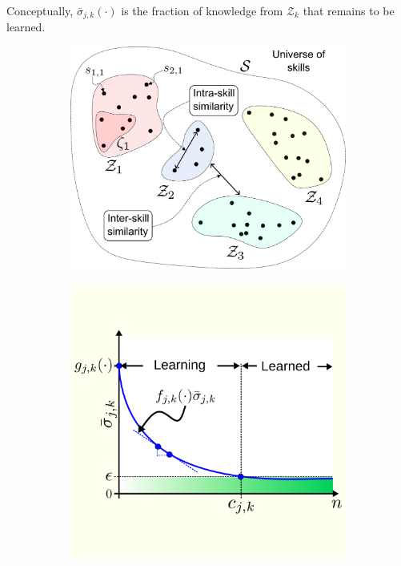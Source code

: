 \documentclass[12pt]{article}
\begin{document}
Conceptually, $\bar{\sigma}_ {j,k}\left(\cdot\right)$ is the fraction of knowledge from ${\mathcal{Z}_k}$ that remains to be learned.
\begin{figure}[!t]
	\centering
	\hspace*{\fill}
	\begin{subfigure}[t]{7.5cm}
		\subcaption{}
		\includegraphics[width=\textwidth]{skill_similarity.png} \label{fig:skill_similarity}
	\end{subfigure}
	\hfill
	\begin{subfigure}[t]{7.5cm}	
		\subcaption{}
		\includegraphics[width=\textwidth]{remaining_knowledge_dynamics_idealization.png} \label{fig:knowledge_idealization}

\end{subfigure}
\end{figure}
\end{document}
